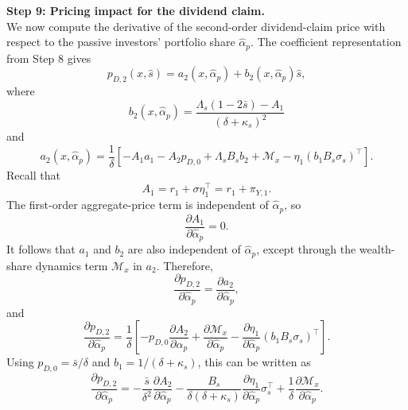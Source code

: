 \noindent\textbf{Step 9: Pricing impact for the dividend claim.}\\
We now compute the derivative of the second-order dividend-claim price with respect to the passive investors' portfolio share $\hat{\alpha}_p$.
The coefficient representation from Step 8 gives
\begin{equation}
    p_{D,2}(x,\hat{s})=a_2(x,\hat{\alpha}_p)+b_2(x,\hat{\alpha}_p)\hat{s},
\end{equation}
where
\begin{equation}
    b_2(x,\hat{\alpha}_p)
    =\frac{\Lambda_s(1-2\bar{s})-A_1}{(\delta+\kappa_s)^2}
\end{equation}
and
\begin{equation}
    a_2(x,\hat{\alpha}_p)
    =\frac{1}{\delta}\left[
        -A_1a_1-A_2p_{D,0}+\Lambda_sB_sb_2+\mathcal{M}_x
        -\eta_1\left(b_1B_s\sigma_s\right)^\top
    \right].
\end{equation}
Recall that
\begin{equation}
    A_1=r_1+\sigma\eta_1^\top=r_1+\pi_{Y,1}.
\end{equation}
The first-order aggregate-price term is independent of $\hat{\alpha}_p$, so
\begin{equation}
    \frac{\partial A_1}{\partial \hat{\alpha}_p}=0.
\end{equation}
It follows that $a_1$ and $b_2$ are also independent of $\hat{\alpha}_p$, except through the wealth-share dynamics term $\mathcal{M}_x$ in $a_2$.
Therefore,
\begin{equation}
    \frac{\partial p_{D,2}}{\partial \hat{\alpha}_p}
    =\frac{\partial a_2}{\partial \hat{\alpha}_p},
\end{equation}
and
\begin{equation}\label{eq:pD2-alpha-derivative-coefficients}
    \frac{\partial p_{D,2}}{\partial \hat{\alpha}_p}
    =\frac{1}{\delta}\left[
        -p_{D,0}\frac{\partial A_2}{\partial \hat{\alpha}_p}
        +\frac{\partial \mathcal{M}_x}{\partial \hat{\alpha}_p}
        -\frac{\partial \eta_1}{\partial \hat{\alpha}_p}
        \left(b_1B_s\sigma_s\right)^\top
    \right].
\end{equation}
Using $p_{D,0}=\bar{s}/\delta$ and $b_1=1/(\delta+\kappa_s)$, this can be written as
\begin{equation}\label{eq:pD2-alpha-derivative-final}
    \frac{\partial p_{D,2}}{\partial \hat{\alpha}_p}
    =-\frac{\bar{s}}{\delta^2}\frac{\partial A_2}{\partial \hat{\alpha}_p}
    -\frac{B_s}{\delta(\delta+\kappa_s)}
        \frac{\partial \eta_1}{\partial \hat{\alpha}_p}\sigma_s^\top
    +\frac{1}{\delta}\frac{\partial \mathcal{M}_x}{\partial \hat{\alpha}_p}.
\end{equation}
